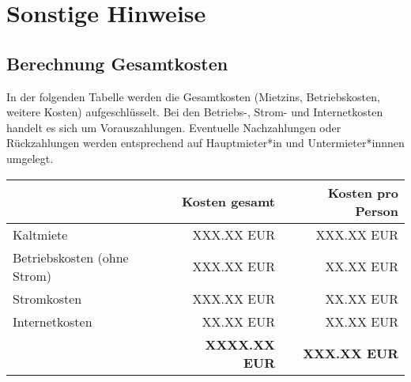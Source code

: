
\section*{Sonstige Hinweise}


\subsection*{Berechnung Gesamtkosten}

In der folgenden Tabelle werden die Gesamtkosten (Mietzins, Betriebskosten,
weitere Kosten) aufgeschlüsselt. Bei den Betriebs-, Strom- und
Internetkosten handelt es sich um Vorauszahlungen. Eventuelle Nachzahlungen
oder Rückzahlungen werden entsprechend auf Hauptmieter*in und
Untermieter*innnen umgelegt.

\begin{center}
  \begin{tabular}{lrr}
    & \textbf{Kosten gesamt} & \textbf{Kosten pro Person} \\\hline
    Kaltmiete & XXX.XX EUR & XXX.XX EUR \\
    Betriebskosten (ohne Strom) & XXX.XX EUR & XX.XX EUR \\
    Stromkosten & XXX.XX EUR & XX.XX EUR \\
    Internetkosten & XX.XX EUR & XX.XX EUR \\\hline
    & \textbf{XXXX.XX EUR} & \textbf{XXX.XX EUR}
  \end{tabular}
\end{center}

